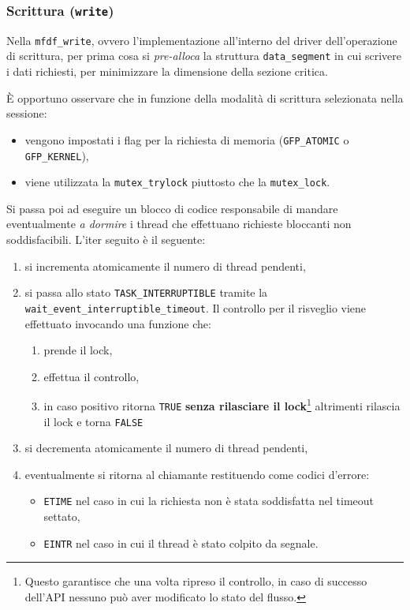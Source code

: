 \documentclass{article}
\begin{document}
\subsubsection{Scrittura (\texttt{write})}
Nella \texttt{mfdf\_write}, ovvero l'implementazione all'interno del driver dell'operazione di scrittura, per prima cosa si \textit{pre-alloca} la struttura \texttt{data\_segment} in cui scrivere i dati richiesti, per minimizzare la dimensione della sezione critica.

È opportuno osservare che in funzione della modalità di scrittura selezionata nella sessione:
\begin{itemize}
        \item vengono impostati i flag per la richiesta di memoria (\texttt{GFP\_ATOMIC} o \texttt{GFP\_KERNEL}),
        \item viene utilizzata la \texttt{mutex\_trylock} piuttosto che la \texttt{mutex\_lock}.
\end{itemize}

Si passa poi ad eseguire un blocco di codice responsabile di mandare eventualmente \textit{a dormire} i thread che effettuano richieste bloccanti non soddisfacibili. L'iter seguito è il seguente:
\begin{enumerate}
        \item si incrementa atomicamente il numero di thread pendenti,
        \item si passa allo stato \texttt{TASK\_INTERRUPTIBLE} tramite la \texttt{wait\_event\_interruptible\_timeout}. Il controllo per il risveglio viene effettuato invocando una funzione che:\begin{enumerate}
                \item prende il lock,
                \item effettua il controllo,
                \item in caso positivo ritorna \texttt{TRUE} \textbf{senza rilasciare il lock}\footnote{Questo garantisce che una volta ripreso il controllo, in caso di successo dell'API nessuno può aver modificato lo stato del flusso.} altrimenti rilascia il lock e torna \texttt{FALSE}
        \end{enumerate}
        \item si decrementa atomicamente il numero di thread pendenti,
        \item eventualmente si ritorna al chiamante restituendo come codici d'errore:
                \begin{itemize}
                        \item \texttt{ETIME} nel caso in cui la richiesta non è stata soddisfatta nel timeout settato,
                        \item \texttt{EINTR} nel caso in cui il thread è stato colpito da segnale.
                \end{itemize}
\end{enumerate}
\end{document}
